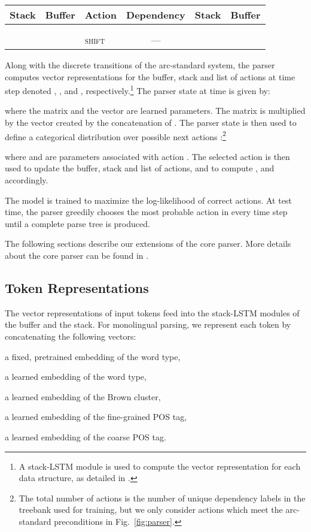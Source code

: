 \documentclass[11pt]{article}
\newenvironment{itemizesquish}{\begin{list}{\labelitemi}{\setlength{\itemsep}{0em}\setlength{\labelwidth}{0.5em}\setlength{\leftmargin}{\labelwidth}\addtolength{\leftmargin}{\labelsep}}}{\end{list}}
\begin{document}
\begin{table*}[!]
\centering
\begin{tabular}{r|r||l|c||r|r}
\textbf{Stack} & \textbf{Buffer} & \textbf{Action} & \textbf{Dependency} & \textbf{Stack} & \textbf{Buffer} \\
\hline
 &   & &  &  &  \\
 &  &  &  &  &  \\
 &  & \textsc{shift} & ---  &  & 
\end{tabular}
\caption{\label{fig:parser} Parser transitions indicating the action applied to the stack and buffer at time  and the resulting stack and buffer at time .}
\end{table*}

Along with the discrete transitions of the arc-standard system, the parser computes vector representations for the buffer, stack and list of actions at time step  denoted , , and , respectively.\footnote{A stack-LSTM module is used to compute the vector representation for each data structure, as detailed in .}
The parser state at time  is given by:

where the matrix  and the vector  are learned parameters. The matrix  is multiplied by the vector  created by the concatenation of .
The parser state  is then used to define a categorical distribution over possible next actions :\footnote{The total number of actions is  the number of unique dependency labels in the treebank used for training, but we only consider actions which meet the arc-standard preconditions in Fig.~\ref{fig:parser}.}

where  and  are parameters associated with action .
The selected action is then used to update the buffer, stack and list of actions, and to compute ,  and  accordingly.

The model is trained to maximize the log-likelihood of correct actions.
At test time, the parser greedily chooses the most probable action in every time step until a complete parse tree is produced.

The following sections describe our extensions of the core parser.
More details about the core parser can be found in .

\subsection{Token Representations}
The vector representations of input tokens feed into the stack-LSTM modules of the buffer and the stack.
For monolingual parsing, we represent each token by concatenating the following vectors:
\begin{itemizesquish}
\item a fixed, pretrained embedding of the word type,
\item a learned embedding of the word type, 
\item a learned embedding of the Brown cluster,
\item a learned embedding of the fine-grained POS tag,
\item a learned embedding of the coarse POS tag.
\end{itemizesquish}
\end{document}
